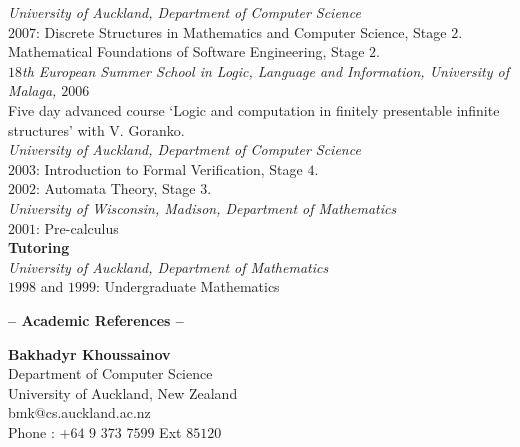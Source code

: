 \documentclass[a4paper]{article}
\def\tit#1{\medskip \begin{center}  {\Large {\bf -- #1 -- }} \end{center}}
\begin{document}
 {\it University of Auckland, Department of Computer Science}\\
 $2007$: Discrete Structures in Mathematics and Computer Science, Stage $2$.\\
 Mathematical Foundations of Software Engineering, Stage $2$.\\

{\it $18$th European Summer School in Logic, Language and Information, University of Malaga, $2006$}\\
 Five day advanced course `Logic and computation in finitely presentable infinite structures'
 with V. Goranko.\\

 {\it University of Auckland, Department of Computer Science} \\
 $2003$: Introduction to Formal Verification, Stage $4$.\\
 $2002$: Automata Theory, Stage $3$.\\

 {\it University of Wisconsin, Madison, Department of Mathematics} \\
 $2001$: Pre-calculus\\
 

  {\bf Tutoring}\\
  {\it University of Auckland, Department of Mathematics} \\
  $1998$ and $1999$: Undergraduate Mathematics\\

\iffalse $1998$ and $1999$: Stages $1$, $2$ and $3$ in the Mathematics \\
	 $1999$: Assistant tutor for `Discrete Mathematics', Stage $2$
	Mathematics\\
	 $1999$: Demonstrator for `Combinatorial Computing', Stage $3$
	Mathematics\\
\fi
\tit{Academic References}


{\bf Bakhadyr Khoussainov}\\
Department of Computer Science\\
University of Auckland, New Zealand\\
bmk@cs.auckland.ac.nz\\
Phone : +$64$ $9$ $373$ $7599$ Ext $85120$\\
\end{document}
